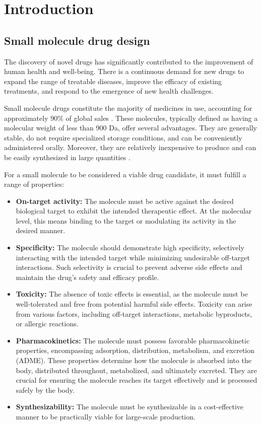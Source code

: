 \chapter{Introduction\label{chap:introduction}}
\section{Small molecule drug design\label{sec:drug-design}}

The discovery of novel drugs has significantly contributed to the improvement of human health and
well-being. There is a continuous demand for new drugs to expand the range of treatable diseases,
improve the efficacy of existing treatments, and respond to the emergence of new health challenges.

Small molecule drugs constitute the majority of medicines in use, accounting for approximately 90\%
of global sales \citep{makurvetBiologicsVsSmall2021}. These molecules, typically defined as having a
molecular weight of less than 900 Da, offer several advantages. They are generally stable, do not
require specialized storage conditions, and can be conveniently administered orally. Moreover, they
are relatively inexpensive to produce and can be easily synthesized in large quantities
\citep{southeyIntroductionSmallMolecule2023}.

For a small molecule to be considered a viable drug candidate, it must fulfill a range of properties:
\begin{itemize}
    \item \textbf{On-target activity:} The molecule must be active against the desired biological target to exhibit
          the intended therapeutic effect. At the molecular level, this means binding to the target or
          modulating its activity in the desired manner.
    \item \textbf{Specificity:} The molecule should demonstrate high specificity, selectively
          interacting with the intended target while minimizing undesirable off-target interactions. Such
          selectivity is crucial to prevent adverse side effects and maintain the drug's safety and efficacy
          profile.
    \item \textbf{Toxicity:} The absence of toxic effects is essential, as the molecule must be
          well-tolerated and free from potential harmful side effects. Toxicity can arise from various
          factors, including off-target interactions, metabolic byproducts, or allergic reactions.
    \item \textbf{Pharmacokinetics:} The molecule must possess favorable pharmacokinetic properties,
          encompassing adsorption, distribution, metabolism, and excretion (ADME). These properties determine
          how the molecule is absorbed into the body, distributed throughout, metabolized, and ultimately
          excreted. They are crucial for ensuring the molecule reaches its target effectively and is processed
          safely by the body.
    \item \textbf{Synthesizability:} The molecule must be synthesizable in a cost-effective manner to be
          practically viable for large-scale production.
\end{itemize}

